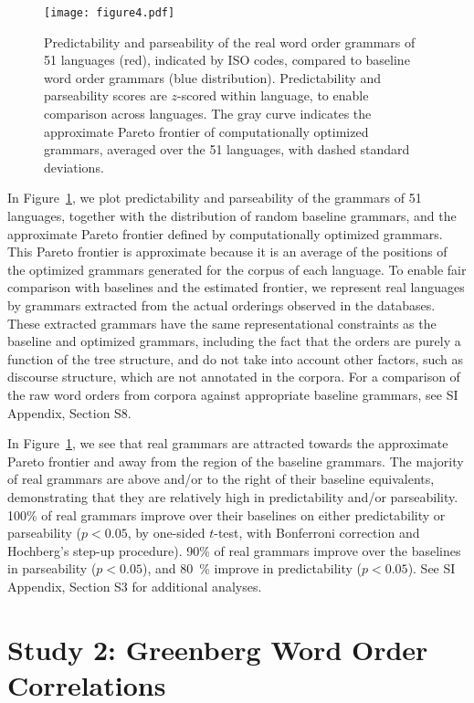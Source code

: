 \documentclass[9pt,twocolumn,twoside,lineno]{pnas-new}
\begin{document}
\begin{figure}
    \centering
    \texttt{[image: figure4.pdf]}
    \caption{Predictability and parseability of the real word order grammars of 51 languages (red), indicated by ISO codes, compared to baseline word order grammars (blue distribution). Predictability and parseability scores are $z$-scored within language, to enable comparison across languages. The gray curve indicates the approximate Pareto frontier of computationally optimized grammars, averaged over the 51 languages, with dashed standard deviations.} 
    \label{fig:pareto-plane}
\end{figure}

In Figure~\ref{fig:pareto-plane}, we plot predictability and parseability of the grammars of 51 languages, together with the distribution of random baseline grammars, and the approximate Pareto frontier defined by computationally optimized grammars.
This Pareto frontier is approximate because it is an average of the positions of the optimized grammars generated for the corpus of each language.
To enable fair comparison with baselines and the estimated frontier, we represent real languages by grammars extracted from the actual orderings observed in the databases. 
These extracted grammars have the same representational constraints as the baseline and optimized grammars,
including the fact that the orders are purely a function of the tree structure, and do not take into account other factors, such as discourse structure, which are not annotated in the corpora.
For a comparison of the raw word orders from corpora against appropriate baseline grammars, see SI Appendix, Section S8.

In Figure~\ref{fig:pareto-plane}, we see that real grammars are attracted towards the approximate Pareto frontier and away from the region of the baseline grammars.
The majority of real grammars are above and/or to the right of their baseline equivalents, demonstrating that they are relatively high in predictability and/or parseability.
100\% of real grammars improve over their baselines on either predictability or parseability ($p<0.05$, by one-sided $t$-test, with Bonferroni correction and Hochberg's step-up procedure).  %
90\% of real grammars improve over the baselines in parseability ($p < 0.05$), and 80~\% improve in predictability ($p < 0.05$).
See SI Appendix, Section S3 for additional analyses.


\section*{Study 2: Greenberg Word Order Correlations}
\label{sec:greenberg}
\end{document}
